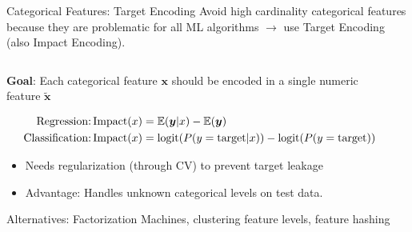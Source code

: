 \begin{frame}{Categorical Features: Target Encoding}
  Avoid high cardinality categorical features because they are problematic for all ML algorithms $\rightarrow$ use Target Encoding (also Impact Encoding).
  \begin{columns}
    \begin{column}{0.7\textwidth}


      \textbf{Goal}: Each categorical feature $\bm{x}$ should be encoded in a single numeric feature $\tilde{\bm{x}}$
      
      \vspace*{-0.5cm}  
      {\footnotesize
      \begin{align*}
      \text{Regression:} \operatorname{Impact}(x) &= \operatorname*{\mathbb{E}}(\bm{y} | x) - \operatorname*{\mathbb{E}}(\bm{y}) \\
      \text{Classification:} \operatorname{Impact}(x) &= \operatorname{logit}(P( y = \text{target} | x)) - \operatorname{logit}(P( y = \text{target}))
      \end{align*}
      }
      \vspace*{-0.5cm}  
      \begin{itemize}
        \item Needs regularization (through CV) to prevent target leakage 
        \item Advantage: Handles unknown categorical levels on test data.
      \end{itemize}
      Alternatives: Factorization Machines, clustering feature levels, feature hashing
    \end{column}%
    \begin{column}{0.3\textwidth}
      \begin{center}

\end{center}
\end{column}
\end{columns}
\end{frame}
